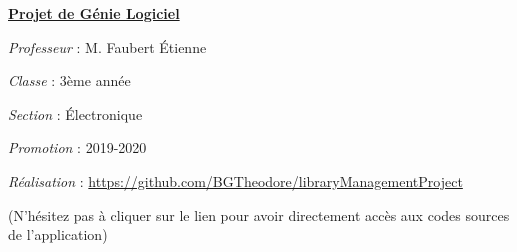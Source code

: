 \documentclass[a4paper,12pt]{report}
\begin{document}
\begin{center}
    \textbf{\underline{Projet de Génie Logiciel}} \par 
    \textit{Professeur} : M. Faubert Étienne \par 
    \textit{Classe} : 3ème année \par 
    \textit{Section} : Électronique \par 
    \textit{Promotion} : 2019-2020 \par 
    \textit{Réalisation} : \url{https://github.com/BGTheodore/libraryManagementProject}\par 
    (N'hésitez pas à cliquer sur le lien pour avoir directement accès aux codes 
    sources de l'application)
\end{center}


\tableofcontents
















\end{document}
